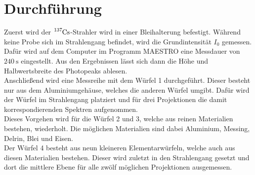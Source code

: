 		
\section{Durchführung}

\noindent 
Zuerst wird der $\ce{^{137}Cs}$-Strahler wird in einer Bleihalterung befestigt.
Während keine Probe sich im Strahlengang befindet, wird die Grundintensität $I_0$ gemessen.
Dafür wird auf dem Computer im Programm MAESTRO eine Messdauer von $\SI{240}{\second}$ eingestellt.
Aus den Ergebnissen lässt sich dann die Höhe und Halbwertsbreite des Photopeaks ablesen.\\
Anschließend wird eine Messreihe mit dem Würfel 1 durchgeführt. Dieser besteht nur aus dem Aluminiumgehäuse, welches die anderen Würfel umgibt.
Dafür wird der Würfel im Strahlengang platziert und für drei Projektionen die damit korrespondierenden Spektren aufgenommen.\\
Dieses Vorgehen wird für die Würfel 2 und 3, welche aus reinen Materialien bestehen, wiederholt. 
Die möglichen Materialien sind dabei Aluminium, Messing, Delrin, Blei und Eisen.\\
Der Würfel 4 besteht aus neun kleineren Elementarwürfeln, welche auch aus diesen Materialien bestehen.
Dieser wird zuletzt in den Strahlengang gesetzt und dort die mittlere Ebene für alle zwölf möglichen Projektionen ausgemessen.